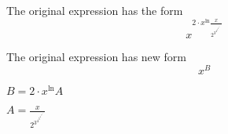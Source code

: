 \documentclass[a4paper, 12pt]{article}
\begin{document}
                          
The original expression has the form \[ {{x} ^ {{2} \cdot {{x} ^  \ln { \frac {{x}} {{{2} ^ {{3} ^ {{4} ^ {{5} ^ {{6} ^ {{7} ^ {{8} ^ {{9} ^ {{10} ^ {{11} ^ {12}}}}}}}}}}}}} }}} \]

The original expression has new form \[ {{x} ^ {B}} \]

$B = {{2} \cdot {{x} ^  \ln {{A}} }}$

$A =  \frac {{x}} {{{2} ^ {{3} ^ {{4} ^ {{5} ^ {{6} ^ {{7} ^ {{8} ^ {{9} ^ {{10} ^ {{11} ^ {12}}}}}}}}}}}}$
\end{document}
